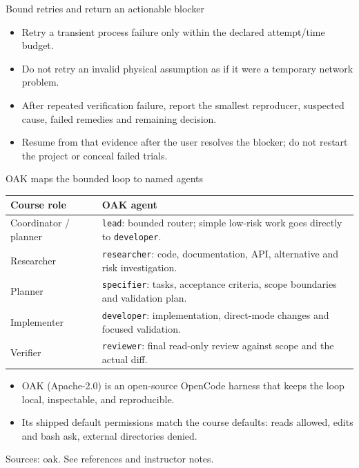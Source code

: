 \documentclass[aspectratio=169,11pt]{beamer}
\begin{document}
\begin{frame}[t,fragile]{Bound retries and return an actionable blocker}
\fontsize{11.5}{14}\selectfont
\begin{itemize}\setlength{\itemsep}{2mm}
\item Retry a transient process failure only within the declared attempt/time budget.
\item Do not retry an invalid physical assumption as if it were a temporary network problem.
\item After repeated verification failure, report the smallest reproducer, suspected cause, failed remedies and remaining decision.
\item Resume from that evidence after the user resolves the blocker; do not restart the project or conceal failed trials.
\end{itemize}
\end{frame}
\begin{frame}[t,fragile]{OAK maps the bounded loop to named agents}
\fontsize{10.5}{12.5}\selectfont\setlength{\tabcolsep}{4pt}\renewcommand{\arraystretch}{1.05}
\begin{tabular}{>{\raggedright\arraybackslash}p{}>{\raggedright\arraybackslash}p{}}
\toprule
\textbf{Course role} & \textbf{OAK agent} \\ \midrule
Coordinator / planner & \texttt{lead}: bounded router; simple low-risk work goes directly to \texttt{developer}. \\[2pt]
Researcher & \texttt{researcher}: code, documentation, API, alternative and risk investigation. \\[2pt]
Planner & \texttt{specifier}: tasks, acceptance criteria, scope boundaries and validation plan. \\[2pt]
Implementer & \texttt{developer}: implementation, direct-mode changes and focused validation. \\[2pt]
Verifier & \texttt{reviewer}: final read-only review against scope and the actual diff. \\[2pt]
\bottomrule\end{tabular}\par\vspace{1mm}
\fontsize{10.5}{12.5}\selectfont
\begin{itemize}\setlength{\itemsep}{2mm}
\item OAK (Apache-2.0) is an open-source OpenCode harness that keeps the loop local, inspectable, and reproducible.
\item Its shipped default permissions match the course defaults: reads allowed, edits and bash ask, external directories denied.
\end{itemize}
\vfill{\fontsize{6.5}{8}\selectfont\color{UTgray} Sources: oak. See references and instructor notes.\par}
\end{frame}
\end{document}
